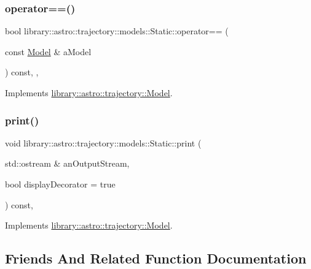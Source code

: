 \subsubsection{\texorpdfstring{operator==()}{operator==()}\hspace{0.1cm}{\footnotesize\ttfamily [2/2]}}
{\footnotesize\ttfamily bool library\+::astro\+::trajectory\+::models\+::\+Static\+::operator== (\begin{DoxyParamCaption}\item[{const \hyperlink{classlibrary_1_1astro_1_1trajectory_1_1_model}{Model} \&}]{a\+Model }\end{DoxyParamCaption}) const\hspace{0.3cm}{\ttfamily [override]}, {\ttfamily [protected]}, {\ttfamily [virtual]}}



Implements \hyperlink{classlibrary_1_1astro_1_1trajectory_1_1_model_a83c52eb23e8feea58d600c87700ed923}{library\+::astro\+::trajectory\+::\+Model}.

\mbox{\label{classlibrary_1_1astro_1_1trajectory_1_1models_1_1_static_af8f9c6fa6ae2d4471868cc970e1ef571}} 
\subsubsection{\texorpdfstring{print()}{print()}}
{\footnotesize\ttfamily void library\+::astro\+::trajectory\+::models\+::\+Static\+::print (\begin{DoxyParamCaption}\item[{std\+::ostream \&}]{an\+Output\+Stream,  }\item[{bool}]{display\+Decorator = {\ttfamily true} }\end{DoxyParamCaption}) const\hspace{0.3cm}{\ttfamily [override]}, {\ttfamily [virtual]}}



Implements \hyperlink{classlibrary_1_1astro_1_1trajectory_1_1_model_af3dd0c38fdbac0b64f689fd8c88c3320}{library\+::astro\+::trajectory\+::\+Model}.



\subsection{Friends And Related Function Documentation}
\mbox{\label{classlibrary_1_1astro_1_1trajectory_1_1models_1_1_static_a6494cb538d45101dc20cb3910455cb13}} 
